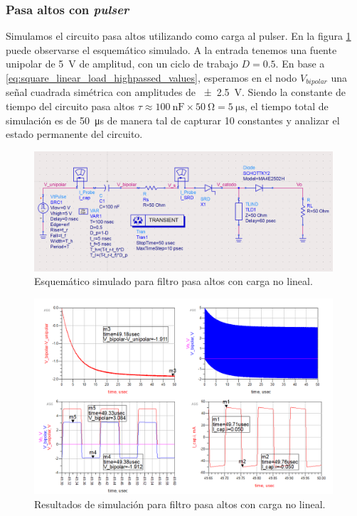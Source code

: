 \subsubsection{Pasa altos con \textit{pulser}}
\label{sec:carga_no_lineal}

Simulamos el circuito pasa altos utilizando como carga al pulser. En la figura
\ref{fig:highpass_filter_nonlinear_load_sch} puede observarse el esquemático
simulado. A la entrada tenemos una fuente unipolar de \qty{5}{\volt} de
amplitud, con un ciclo de trabajo $D=0.5$. En base a
\ref{eq:square_linear_load_highpassed_values}, esperamos en el nodo
$V_{bipolar}$ una señal cuadrada simétrica con amplitudes de
\qty{\pm2.5}{\volt}. Siendo la constante de tiempo del circuito pasa altos $\tau
\approx \qty{100}{\nano\farad} \times \qty{50}{\ohm} = \qty{5}{\micro\second}$,
el tiempo total de simulación es de \qty{50}{\micro\second} de manera tal de
capturar 10 constantes y analizar el estado permanente del circuito.

\begin{figure}[tbp]
    \centering
    \includegraphics[width=0.99\textwidth]{images/highpass_filter_nonlinear_load_sch.png}
    \caption{Esquemático simulado para filtro pasa altos con carga no lineal.}
    \label{fig:highpass_filter_nonlinear_load_sch}
\end{figure}

\begin{figure}[tbp]
    \centering
    \includegraphics[width=0.99\textwidth]{images/highpass_filter_nonlinear_load_sim_result.png}
    \caption{Resultados de simulación para filtro pasa altos con carga no lineal.}
    \label{fig:highpass_filter_nonlinear_load_sim_result}
\end{figure}

